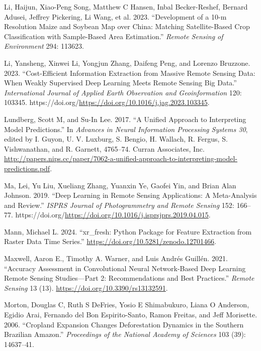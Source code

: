 \documentclass[
  journal,
  twocolumn]{IEEEtran}
\newlength{\cslhangindent}
\newlength{\cslentryspacingunit} %
\newenvironment{CSLReferences}[2] %
 {%
  \setlength{\parindent}{0pt}
  \ifodd #1
  \let\oldpar\par
  \def\par{\hangindent=\cslhangindent\oldpar}
  \fi
  \setlength{\parskip}{#2\cslentryspacingunit}
 }%
 {}
\begin{document}
\begin{CSLReferences}{1}{0}
\leavevmode{}%
Li, Haijun, Xiao-Peng Song, Matthew C Hansen, Inbal Becker-Reshef,
Bernard Adusei, Jeffrey Pickering, Li Wang, et al. 2023. {``Development
of a 10-m Resolution Maize and Soybean Map over China: Matching
Satellite-Based Crop Classification with Sample-Based Area
Estimation.''} \emph{Remote Sensing of Environment} 294: 113623.

\leavevmode{}%
Li, Yansheng, Xinwei Li, Yongjun Zhang, Daifeng Peng, and Lorenzo
Bruzzone. 2023. {``Cost-Efficient Information Extraction from Massive
Remote Sensing Data: When Weakly Supervised Deep Learning Meets Remote
Sensing Big Data.''} \emph{International Journal of Applied Earth
Observation and Geoinformation} 120: 103345.
https://doi.org/\url{https://doi.org/10.1016/j.jag.2023.103345}.

\leavevmode{}%
Lundberg, Scott M, and Su-In Lee. 2017. {``A Unified Approach to
Interpreting Model Predictions.''} In \emph{Advances in Neural
Information Processing Systems 30}, edited by I. Guyon, U. V. Luxburg,
S. Bengio, H. Wallach, R. Fergus, S. Vishwanathan, and R. Garnett,
4765--74. Curran Associates, Inc.
\url{http://papers.nips.cc/paper/7062-a-unified-approach-to-interpreting-model-predictions.pdf}.

\leavevmode{}%
Ma, Lei, Yu Liu, Xueliang Zhang, Yuanxin Ye, Gaofei Yin, and Brian Alan
Johnson. 2019. {``Deep Learning in Remote Sensing Applications: A
Meta-Analysis and Review.''} \emph{ISPRS Journal of Photogrammetry and
Remote Sensing} 152: 166--77.
https://doi.org/\url{https://doi.org/10.1016/j.isprsjprs.2019.04.015}.

\leavevmode{}%
Mann, Michael L. 2024. {``{xr\_fresh: Python Package for Feature
Extraction from Raster Data Time Series}.''}
\url{https://doi.org/10.5281/zenodo.12701466}.

\leavevmode{}%
Maxwell, Aaron E., Timothy A. Warner, and Luis Andrés Guillén. 2021.
{``Accuracy Assessment in Convolutional Neural Network-Based Deep
Learning Remote Sensing Studies---Part 2: Recommendations and Best
Practices.''} \emph{Remote Sensing} 13 (13).
\url{https://doi.org/10.3390/rs13132591}.

\leavevmode{}%
Morton, Douglas C, Ruth S DeFries, Yosio E Shimabukuro, Liana O
Anderson, Egidio Arai, Fernando del Bon Espirito-Santo, Ramon Freitas,
and Jeff Morisette. 2006. {``Cropland Expansion Changes Deforestation
Dynamics in the Southern Brazilian Amazon.''} \emph{Proceedings of the
National Academy of Sciences} 103 (39): 14637--41.


\end{CSLReferences}
\end{document}

